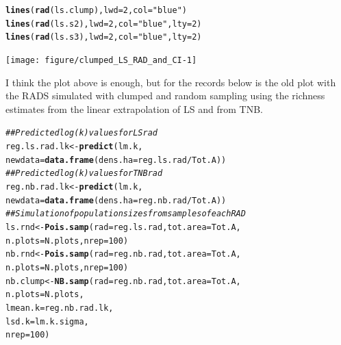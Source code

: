 \documentclass[12pt, A4]{article}\usepackage[]{graphicx}\usepackage[]{color}
\makeatletter
\newcommand{\hlnum}[1]{\textcolor[rgb]{0.686,0.059,0.569}{#1}}%
\newcommand{\hlstr}[1]{\textcolor[rgb]{0.192,0.494,0.8}{#1}}%
\newcommand{\hlcom}[1]{\textcolor[rgb]{0.678,0.584,0.686}{\textit{#1}}}%
\newcommand{\hlopt}[1]{\textcolor[rgb]{0,0,0}{#1}}%
\newcommand{\hlstd}[1]{\textcolor[rgb]{0.345,0.345,0.345}{#1}}%
\newcommand{\hlkwb}[1]{\textcolor[rgb]{0.69,0.353,0.396}{#1}}%
\newcommand{\hlkwc}[1]{\textcolor[rgb]{0.333,0.667,0.333}{#1}}%
\newcommand{\hlkwd}[1]{\textcolor[rgb]{0.737,0.353,0.396}{\textbf{#1}}}%
\newenvironment{kframe}{%
 \def\at@end@of@kframe{}%
 \ifinner\ifhmode%
  \def\at@end@of@kframe{\end{minipage}}%
  \begin{minipage}{\columnwidth}%
 \fi\fi%
 \def\FrameCommand##1{\hskip\@totalleftmargin \hskip-\fboxsep
 \colorbox{shadecolor}{##1}\hskip-\fboxsep
     \hskip-\linewidth \hskip-\@totalleftmargin \hskip\columnwidth}%
 \MakeFramed {\advance\hsize-\width
   \@totalleftmargin\z@ \linewidth\hsize
   \@setminipage}}%
 {\par\unskip\endMakeFramed%
 \at@end@of@kframe}
\newenvironment{knitrout}{}{} %
\makeatother
\begin{document}
\begin{knitrout}
\begin{kframe}
\begin{alltt}
\hlkwd{lines}\hlstd{(}\hlkwd{rad}\hlstd{(ls.clump),} \hlkwc{lwd}\hlstd{=}\hlnum{2}\hlstd{,} \hlkwc{col}\hlstd{=}\hlstr{"blue"}\hlstd{)}
\hlkwd{lines}\hlstd{(}\hlkwd{rad}\hlstd{(ls.s2),} \hlkwc{lwd}\hlstd{=}\hlnum{2}\hlstd{,} \hlkwc{col}\hlstd{=}\hlstr{"blue"}\hlstd{,} \hlkwc{lty}\hlstd{=}\hlnum{2}\hlstd{)}
\hlkwd{lines}\hlstd{(}\hlkwd{rad}\hlstd{(ls.s3),} \hlkwc{lwd}\hlstd{=}\hlnum{2}\hlstd{,} \hlkwc{col}\hlstd{=}\hlstr{"blue"}\hlstd{,} \hlkwc{lty}\hlstd{=}\hlnum{2}\hlstd{)}
\end{alltt}
\end{kframe}

{\centering \texttt{[image: figure/clumped\_LS\_RAD\_and\_CI-1]} 

}



\end{knitrout}


I think the plot above is enough, but for the records below
is the old plot with the RADS simulated with clumped and random sampling
using the richness estimates from the linear extrapolation of LS
and from TNB.

\begin{knitrout}
\color{fgcolor}\begin{kframe}
\begin{alltt}
\hlcom{## Predicted log(k) values for LS rad}
\hlstd{reg.ls.rad.lk} \hlkwb{<-} \hlkwd{predict}\hlstd{(lm.k,}
                         \hlkwc{newdata}\hlstd{=}\hlkwd{data.frame}\hlstd{(}\hlkwc{dens.ha}\hlstd{=reg.ls.rad}\hlopt{/}\hlstd{Tot.A))}
\hlcom{## Predicted log(k) values for TNB rad}
\hlstd{reg.nb.rad.lk} \hlkwb{<-} \hlkwd{predict}\hlstd{(lm.k,}
                           \hlkwc{newdata}\hlstd{=}\hlkwd{data.frame}\hlstd{(}\hlkwc{dens.ha}\hlstd{=reg.nb.rad}\hlopt{/}\hlstd{Tot.A))}
\hlcom{## Simulation of population sizes from samples of each RAD}
\hlstd{ls.rnd} \hlkwb{<-} \hlkwd{Pois.samp}\hlstd{(}\hlkwc{rad} \hlstd{= reg.ls.rad,} \hlkwc{tot.area} \hlstd{= Tot.A,}
                    \hlkwc{n.plots} \hlstd{= N.plots,} \hlkwc{nrep}\hlstd{=}\hlnum{100}\hlstd{)}
\hlstd{nb.rnd} \hlkwb{<-} \hlkwd{Pois.samp}\hlstd{(}\hlkwc{rad} \hlstd{= reg.nb.rad,} \hlkwc{tot.area} \hlstd{= Tot.A,}
                    \hlkwc{n.plots} \hlstd{= N.plots,} \hlkwc{nrep} \hlstd{=} \hlnum{100}\hlstd{)}
\hlstd{nb.clump} \hlkwb{<-} \hlkwd{NB.samp}\hlstd{(}\hlkwc{rad} \hlstd{= reg.nb.rad,} \hlkwc{tot.area} \hlstd{= Tot.A,}
                    \hlkwc{n.plots} \hlstd{= N.plots,}
                    \hlkwc{lmean.k} \hlstd{= reg.nb.rad.lk,}
                    \hlkwc{lsd.k} \hlstd{= lm.k.sigma,}
                    \hlkwc{nrep} \hlstd{=} \hlnum{100}\hlstd{)}
\end{alltt}
\end{kframe}
\end{knitrout}
\end{document}
